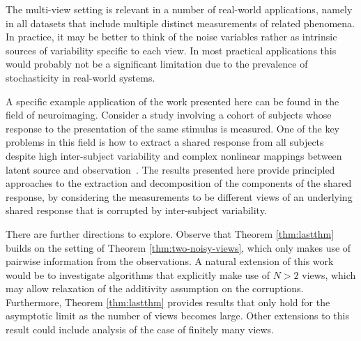 The multi-view setting is relevant in a number of real-world applications, namely in all datasets that include multiple distinct measurements of related phenomena.
In practice, it may be better to think of the noise variables rather as intrinsic sources of variability specific to each view.
In most practical applications this would probably not be a significant limitation due to the prevalence of stochasticity in real-world systems.

A specific example application of the work presented here can be found in the field of neuroimaging.
Consider a study involving a cohort of subjects whose response to the presentation of the same stimulus is measured.
One of the key problems in this field is how to extract a shared response from all subjects despite high inter-subject variability and complex nonlinear mappings between latent source and observation~\citep{haxby2011common, chen2015reduced}.
The results presented here provide principled approaches to the extraction and decomposition of the components of the shared response, by considering the measurements to be different views of an underlying shared response that is corrupted by inter-subject variability.



There are further directions to explore.
Observe that Theorem \ref{thm:lastthm} builds on the setting of Theorem \ref{thm:two-noisy-views}, which only makes use of pairwise information from the observations.
A natural extension of this work would be to investigate algorithms that explicitly make use of $N>2$ views, which may allow relaxation of the additivity assumption on the corruptions.
Furthermore, Theorem \ref{thm:lastthm} provides results that only hold for the asymptotic limit as the number of views becomes large.
Other extensions to this result could include analysis of the case of finitely many views.





